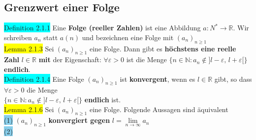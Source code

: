 \documentclass[landscape, 10pt]{article}
\newcommand{\R}{\mathbb{R}}
\newcommand{\N}{\mathbb{N}}
\begin{document}
\begin{multicols}{3}
       \subsection{Grenzwert einer Folge}
              \colorbox{cyan}{Definition 2.1.1} 
                     Eine \textbf{Folge (reeller Zahlen)} ist 
                     eine Abbildung \textcolor{NavyBlue}{
                     $a:N^{*}\longrightarrow\R$}. 
                     Wir schreiben \textcolor{NavyBlue}{$a_n$} 
                     statt \textcolor{NavyBlue}{$a(n)$} und 
                     bezeichnen eine Folge mit 
                     \textcolor{NavyBlue}{$(a_n)_{n\geqslant 1}$}\\
              \colorbox{yellow}{Lemma 2.1.3} 
                     Sei \textcolor{NavyBlue}{$(a_n)_{n\geqslant 1}$} eine 
                     Folge. Dann gibt es 
                     \textbf{höchstens eine reelle Zahl} 
                     \textcolor{NavyBlue}{$l\in\R$} 
                     \textbf{mit} der Eigenschaft: 
                     \textcolor{NavyBlue}{$\forall\varepsilon >0$} 
                     ist die Menge 
                     \textcolor{NavyBlue}{
                     $\{n\in\N:a_n\notin ]l-\varepsilon,\,l+\varepsilon[\}$} 
                     \textbf{endlich}.\\
              \colorbox{cyan}{Definition 2.1.4} 
                     Eine Folge \textcolor{NavyBlue}{
                     $(a_n)_{n\geqslant 1}$} ist 
                     \textbf{konvergent}, wenn es 
                     \textcolor{NavyBlue}{$l\in\R$} 
                     gibt, so dass 
                     \textcolor{NavyBlue}{$\forall\varepsilon >0$} die Menge\\ 
                     \textcolor{NavyBlue}{
                     $\{n\in\N:a_n\notin ]l-\varepsilon,\, l+\varepsilon[\}$} 
                     \textbf{endlich} ist.\\
              \colorbox{yellow}{Lemma 2.1.6} 
                     Sei \textcolor{NavyBlue}{
                     $(a_n)_{n\geqslant 1}$} eine Folge. 
                     Folgende Aussagen sind äquivalent\\
                     \colorbox{SkyBlue}{(1)} 
                            \textcolor{NavyBlue}{$(a_n)_{n\geqslant 1}$} 
                            \textbf{konvergiert gegen} 
                            \textcolor{NavyBlue}{$l=\lim\limits_{n\to\infty}a_n$}\\
                     \quad\colorbox{SkyBlue}{(2)} 
                            \textcolor{NavyBlue}{
}
\end{multicols}
\end{document}
